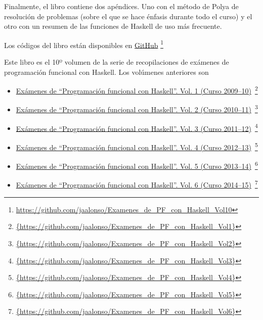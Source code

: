 \documentclass[a4paper,12pt,twoside]{book}
\begin{document}
Finalmente, el libro contiene dos apéndices. Uno con el método de Polya
de resolución de problemas (sobre el que se hace énfasis durante todo el
curso) y el otro con un resumen de las funciones de Haskell de uso más
frecuente.

Los códigos del libro están disponibles en
\href{https://github.com/jaalonso/Examenes_de_PF_con_Haskell_Vol10}
     {GitHub}
     \footnote{{\url{https://github.com/jaalonso/Examenes_de_PF_con_Haskell_Vol10}}}

Este libro es el 10º volumen de la serie de recopilaciones de
exámenes de programación funcional con Haskell. Los volúmenes anteriores son
\begin{itemize}
\item
  \href{https://github.com/jaalonso/Examenes_de_PF_con_Haskell_Vol1}
  {Exámenes de ``Programaci\'on funcional con Haskell''.
    Vol. 1 (Curso 2009--10)}\
    \footnote{\url{{https://github.com/jaalonso/Examenes_de_PF_con_Haskell_Vol1}}}

\item
  \href{https://github.com/jaalonso/Examenes_de_PF_con_Haskell_Vol2}
  {Exámenes de ``Programaci\'on funcional con Haskell''.
    Vol. 2 (Curso 2010--11)}\
    \footnote{\url{{https://github.com/jaalonso/Examenes_de_PF_con_Haskell_Vol2}}}

\item
  \href{https://github.com/jaalonso/Examenes_de_PF_con_Haskell_Vol3}
  {Exámenes de ``Programaci\'on funcional con Haskell''.
    Vol. 3 (Curso 2011--12)}\
    \footnote{\url{{https://github.com/jaalonso/Examenes_de_PF_con_Haskell_Vol3}}}

\item
  \href{https://github.com/jaalonso/Examenes_de_PF_con_Haskell_Vol4}
  {Exámenes de ``Programaci\'on funcional con Haskell''.
    Vol. 4 (Curso 2012--13)}\
    \footnote{\url{{https://github.com/jaalonso/Examenes_de_PF_con_Haskell_Vol4}}}

\item
  \href{https://github.com/jaalonso/Examenes_de_PF_con_Haskell_Vol5}
  {Exámenes de ``Programaci\'on funcional con Haskell''.
    Vol. 5 (Curso 2013--14)}\
    \footnote{\url{{https://github.com/jaalonso/Examenes_de_PF_con_Haskell_Vol5}}}

\item
  \href{https://github.com/jaalonso/Examenes_de_PF_con_Haskell_Vol6}
  {Exámenes de ``Programaci\'on funcional con Haskell''.
    Vol. 6 (Curso 2014--15)}\
    \footnote{\url{{https://github.com/jaalonso/Examenes_de_PF_con_Haskell_Vol6}}}


\end{itemize}
\end{document}
